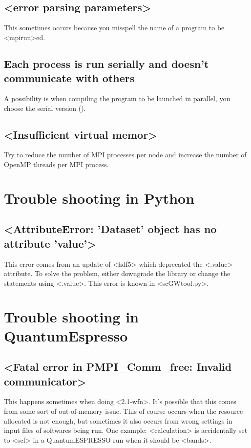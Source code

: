 \documentclass[hyperref, a4paper, 12pt]{report}
\def\texttt#1{<#1>}%
\newcommand{\shortcode}[1]{\texttt{#1}}
\begin{document}
\subsection{\shortcode{error parsing parameters}}

This sometimes occurs because you misspell the name of a program 
to be \shortcode{mpirun}ed.

\subsection{Each process is run serially and doesn't communicate with others}

A possibility is when compiling the program to be launched in parallel,
you choose the serial version ().

\subsection{\shortcode{Insufficient virtual memor}}

Try to reduce the number of MPI processes per node 
and increase the number of OpenMP threads per MPI process.


\section{Trouble shooting in Python}

\subsection{\shortcode{AttributeError: 'Dataset' object has no attribute 'value'}}

This error comes from an update of \shortcode{hdf5} 
which deprecated the \shortcode{.value} attribute.
To solve the problem, 
either downgrade the library 
or change the statements using \shortcode{.value}.
This error is known in \shortcode{scGWtool.py}.

\section{Trouble shooting in QuantumEspresso}

\subsection{\shortcode{Fatal error in PMPI_Comm_free: Invalid communicator}}

This happens sometimes when doing \shortcode{2.1-wfn}.
It's possible that this comes from some sort of out-of-memory issue.
This of course occurs when the resource allocated is not enough,
but sometimes it also occurs from wrong settings in input files of
softwares being run.
One example: \shortcode{calculation} is accidentally set to \shortcode{scf} 
in a QuantumESPRESSO run 
when it should be \shortcode{bands}.
\end{document}
